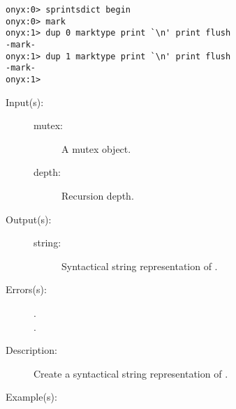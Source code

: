 \begin{description}
\begin{description}
\begin{verbatim}
onyx:0> sprintsdict begin
onyx:0> mark
onyx:1> dup 0 marktype print `\n' print flush
-mark-
onyx:1> dup 1 marktype print `\n' print flush
-mark-
onyx:1>
		\end{verbatim}
	\end{description}
\label{sprintsdict:mutextype}
\item[{\onyxop{mutex depth}{mutextype}{string}}: ]
	\begin{description}\item[]
	\item[Input(s): ]
		\begin{description}\item[]
		\item[mutex: ]
			A mutex object.
		\item[depth: ]
			Recursion depth.
		\end{description}
	\item[Output(s): ]
		\begin{description}\item[]
		\item[string: ]
			Syntactical string representation of .
		\end{description}
	\item[Errors(s): ]
		\begin{description}\item[]
		\item[.]
		\item[.]
		\end{description}
	\item[Description: ]
		Create a syntactical string representation of .
	\item[Example(s): ]\begin{verbatim}


\end{verbatim}
\end{description}
\end{description}
